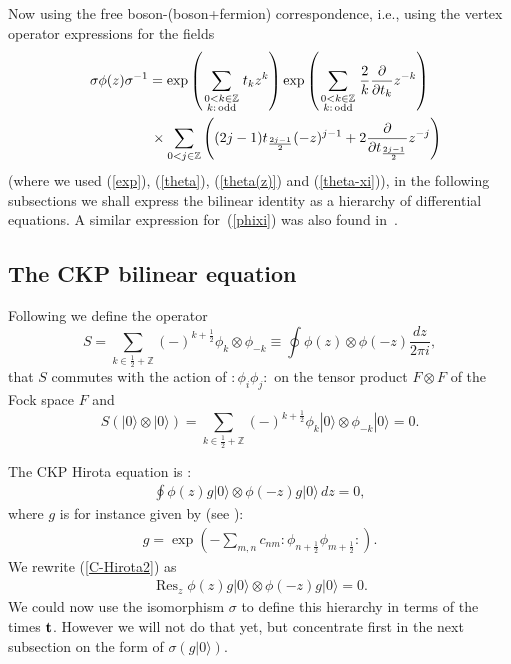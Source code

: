 \documentclass[pdftex]{sigma}
\numberwithin{equation}{section}
\newcommand{\Res}{\mathop\mathrm{Res}\nolimits}
\begin{document}
Now using the free boson-(boson+fermion) correspondence, i.e.,
using the vertex operator expressions for the f\/ields
\begin{gather}
\sigma\phi(z)\sigma^{-1} =
\exp\left( \sum_{\scriptstyle0<k\in\mathbb{Z}\atop\scriptstyle k:\,\mathrm{odd}}t_kz^k \right)
\exp\left( \sum_{\scriptstyle0<k\in\mathbb{Z}\atop\scriptstyle k:\,\mathrm{odd}}
\frac{2}{k}\frac{\partial}{\partial t_k}z^{-k} \right)\nonumber\\
\hphantom{\sigma\phi(z)\sigma^{-1} =}{}\times
\sum_{0<j\in\mathbb{Z}}\left( (2j-1)t_{\frac{2j-1}2}(-z)^{j-1}+2\frac{\partial}{\partial
t_{\frac{2j-1}2}}z^{-j} \right)\label{phixi}
\end{gather}
(where we used (\ref{exp}), (\ref{theta}), (\ref{theta(z)}) and (\ref{theta-xi})),
in the following subsections
we shall express the bilinear identity as a hierarchy of dif\/ferential equations.
A similar expression  for~(\ref{phixi}) was also found in~\cite{Kac-Leur}.

\subsection{The CKP bilinear equation}

Following \cite{DJKMVI}  we def\/ine the operator
\[
S=\sum_{k\in\frac{1}{2}+\mathbb{Z}}(-)^{k+\frac{1}{2}}\phi_k\otimes
\phi_{-k} \equiv   \oint \phi(z)\otimes \phi(-z)
\frac{dz}{2\pi i} ,
\]
that $S$ commutes with the action of ${:}\phi_i\phi_j{:}$ on the
tensor product $F\otimes F$ of the Fock space $F$ and
\[
S(|0\rangle \otimes |0\rangle)=
\sum_{k\in\frac{1}{2}+\mathbb{Z}}(-)^{k+\frac{1}{2}}\phi_k|0\rangle
\otimes \phi_{-k}|0\rangle  =0 .
\]


The CKP Hirota equation is \cite{DJKMVI}:
\begin{gather}\label{C-Hirota2}
\oint \phi(z)g|0\rangle \otimes \phi(-z)g|0\rangle\,dz=0 ,
\end{gather}
where  $g$ is for instance given by (see \cite{DJKMVI}):
\begin{gather}
\label{g'} g=\exp\left( -\sum_{m,n}
c_{nm}{:}\phi_{n+\frac{1}{2}}\phi_{m+\frac{1}{2}}{:} \right).
\end{gather}
We rewrite (\ref{C-Hirota2}) as
\begin{gather}\label{C-Hirota3}
\Res_z \phi(z)g|0\rangle \otimes \phi(-z)g|0\rangle =0.
\end{gather}
We could now  use the isomorphism $\sigma$ to def\/ine this hierarchy in terms of the times $\bf t$.
However we will not do that yet, but concentrate f\/irst in the next subsection on the form of $\sigma(g|0\rangle)$.
\end{document}
